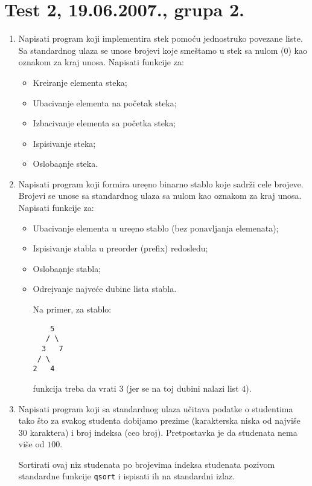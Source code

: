 \section{Test 2, 19.06.2007., grupa 2.}


\begin{enumerate}

\item Napisati program koji implementira stek pomo\' cu jednostruko
povezane liste. Sa standardnog ulaza se unose brojevi koje sme\v
stamo u stek sa nulom ($0$) kao oznakom za kraj unosa. Napisati
funkcije za:

\begin{itemize}
\item Kreiranje elementa steka;
\item Ubacivanje elementa na po\v cetak steka;
\item Izbacivanje elementa sa po\v cetka steka;
\item Ispisivanje steka;
\item Osloba\d anje steka.
\end{itemize}

\item Napisati program koji formira ure\d eno binarno stablo koje sadr\v zi
cele brojeve. Brojevi se unose sa standardnog ulaza sa nulom kao
oznakom za kraj unosa. Napisati funkcije za:

\begin{itemize}
\item Ubacivanje elementa u ure\d eno stablo (bez ponavljanja elemenata);
\item Ispisivanje stabla u preorder (prefix) redosledu;
\item Osloba\d anje stabla;
\item Odre\d ivanje najve\' ce dubine lista stabla.

Na primer, za stablo:

\begin{verbatim}
    5
   / \
  3   7
 / \
2   4
\end{verbatim}

funkcija treba da vrati $3$ (jer se na toj dubini nalazi list $4$).
\end{itemize}

\item Napisati program koji sa standardnog ulaza u\v citava podatke o
studentima tako \v sto za svakog studenta dobijamo prezime
(karakterska niska od najvi\v se $30$ karaktera) i broj indeksa (ceo broj).
Pretpostavka je da studenata nema vi\v se od $100$.

Sortirati ovaj niz studenata po brojevima indeksa studenata
pozivom standardne funkcije {\tt qsort} i ispisati ih na
standardni izlaz.

\end{enumerate}


